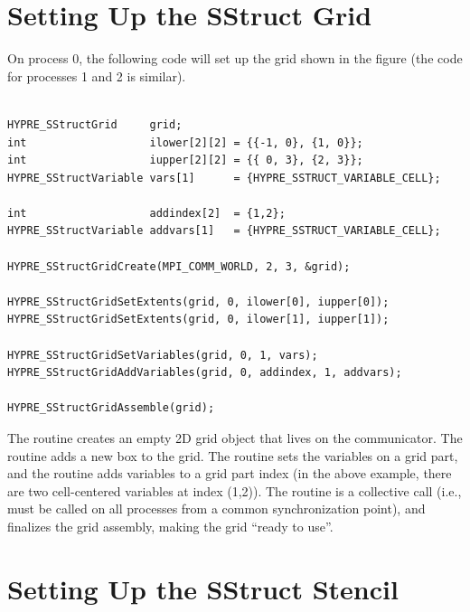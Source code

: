 
\section{Setting Up the SStruct Grid}
\label{Setting Up the SStruct Grid}

On process 0, the following code will set up the grid shown in the
figure (the code for processes 1 and 2 is similar).
\begin{display}
\begin{verbatim}

HYPRE_SStructGrid     grid;
int                   ilower[2][2] = {{-1, 0}, {1, 0}};
int                   iupper[2][2] = {{ 0, 3}, {2, 3}};
HYPRE_SStructVariable vars[1]      = {HYPRE_SSTRUCT_VARIABLE_CELL};

int                   addindex[2]  = {1,2};
HYPRE_SStructVariable addvars[1]   = {HYPRE_SSTRUCT_VARIABLE_CELL};

HYPRE_SStructGridCreate(MPI_COMM_WORLD, 2, 3, &grid);

HYPRE_SStructGridSetExtents(grid, 0, ilower[0], iupper[0]);
HYPRE_SStructGridSetExtents(grid, 0, ilower[1], iupper[1]);

HYPRE_SStructGridSetVariables(grid, 0, 1, vars);
HYPRE_SStructGridAddVariables(grid, 0, addindex, 1, addvars);

HYPRE_SStructGridAssemble(grid);

\end{verbatim}
\end{display}
The  routine creates an empty 2D grid object that lives
on the  communicator.  The 
routine adds a new box to the grid.  The  routine
sets the variables on a grid part, and the 
routine adds variables to a grid part index (in the above example,
there are two cell-centered variables at index (1,2)).  The
 routine is a collective call (i.e., must be called
on all processes from a common synchronization point), and finalizes
the grid assembly, making the grid ``ready to use''.


\section{Setting Up the SStruct Stencil}
\label{Setting Up the SStruct Stencil}

